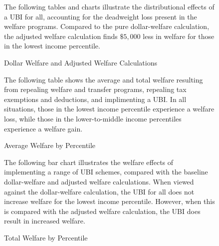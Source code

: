 \documentclass{article}
\begin{document}
\begin{figure}[H]
The following tables and charts illustrate the distributional effects of a UBI for all, accounting for the deadweight loss present in the welfare programs. Compared to the pure dollar-welfare calculation, the adjusted welfare calculation finds $\$5,000$ less in welfare for those in the lowest income percentile.

\begin{table}[H]
\caption{Dollar Welfare and Adjusted Welfare Calculations}
\begin{center}
\begin{adjustbox}{max width=\textwidth}

\end{adjustbox}
\end{center}
\end{table}

The following table shows the average and total welfare resulting from repealing welfare and transfer programs, repealing tax exemptions and deductions, and implimenting a UBI. In all situations, those in the lowest income percentile experience a welfare loss, while those in the lower-to-middle income percentiles experience a welfare gain. 


\begin{table}[H]
\caption{Average Welfare by Percentile}
\begin{center}
\begin{adjustbox}{max width=\textwidth}

\end{adjustbox}
\end{center}
\end{table}


\begin{table}[H]
\caption{Total Welfare by Percentile}
\begin{center}
\begin{adjustbox}{max width=\textwidth}

\end{adjustbox}
\end{center}
\end{table}

The following bar chart illustrates the welfare effects of implementing a range of UBI schemes, compared with the baseline dollar-welfare and adjusted welfare calculations. When viewed against the dollar-welfare calculation, the UBI for all does not increase welfare for the lowest income percentile. However, when this is compared with the adjusted welfare calculation, the UBI does result in increased welfare.  


\end{figure}
\end{document}
